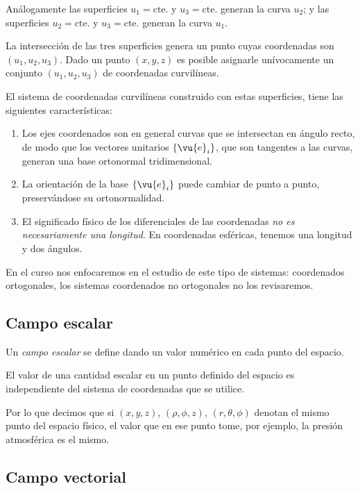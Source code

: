 Análogamente las superficies $u_{1} = \mbox{cte.}$ y $u_{3} = \mbox{cte.}$ generan la curva $u_{2}$; y las superficies $u_{2} = \mbox{cte.}$ y $u_{3} = \mbox{cte.}$ generan la curva $u_{1}$.
\par   
La intersección de las tres superficies genera un punto cuyas coordenadas son $(u_{1}, u_{2}, u_{3})$. Dado un punto $(x, y, z)$ es posible asignarle unívocamente un conjunto $(u_{1}, u_{2}, u_{3})$ de coordenadas curvilíneas.
\par
El sistema de coordenadas curvilíneas construido con estas superficies, tiene las siguientes características:
\begin{enumerate}
\item Los ejes coordenados son en general curvas que se intersectan en ángulo recto, de modo que los vectores unitarios $\left\{ \vu{e}_{i} \right\}$, que son tangentes a las curvas, generan una base ortonormal tridimensional.
\item La orientación de la base $\left\{ \vu{e}_{i} \right\}$ puede cambiar de punto a punto, preservándose su ortonormalidad.
\item El significado físico de los diferenciales de las coordenadas \emph{no es necesariamente una longitud}. En coordenadas esféricas, tenemos una longitud y dos ángulos.
\end{enumerate}
En el curso nos enfocaremos en el estudio de este tipo de sistemas: coordenados ortogonales, los sistemas coordenados no ortogonales no los revisaremos.

\subsection*{Campo escalar}

Un \emph{campo escalar} se define dando un valor numérico en cada punto del espacio.
\par
El valor de una cantidad escalar en un punto definido del espacio es independiente del sistema de coordenadas que se utilice.
\par
Por lo que decimos que si $(x, y, z)$, $(\rho, \phi, z)$, $(r, \theta, \phi)$ denotan el mismo punto del espacio físico, el valor que en ese punto tome, por ejemplo, la presión atmosférica es el mismo.

\subsection*{Campo vectorial}

